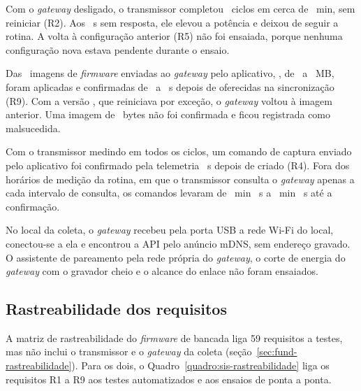 Com o \textit{gateway} desligado, o transmissor completou \sisSemGatewayCiclos\ ciclos em cerca de \sisSemGatewayMin~min, sem reiniciar (R2). Aos \sisSemGatewayFallbackS~s sem resposta, ele elevou a potência e deixou de seguir a rotina. A volta à configuração anterior (R5) não foi ensaiada, porque nenhuma configuração nova estava pendente durante o ensaio.

Das \sisOtaImagens\ imagens de \textit{firmware} enviadas ao \textit{gateway} pelo aplicativo, \sisOtaAplicadas, de \sisOtaTamanhoMin\ a \sisOtaTamanhoMax~MB, foram aplicadas e confirmadas de \sisOtaDuracaoMin\ a \sisOtaDuracaoMax~s depois de oferecidas na sincronização (R9). Com a versão \sisOtaRevertidaVersao, que reiniciava por exceção, o \textit{gateway} voltou à imagem anterior. Uma imagem de \sisOtaSemConfirmacaoBytes\ bytes não foi confirmada e ficou registrada como malsucedida.

Com o transmissor medindo em todos os ciclos, um comando de captura enviado pelo aplicativo foi confirmado pela telemetria \sisComandoCapturaS~s depois de criado (R4). Fora dos horários de medição da rotina, em que o transmissor consulta o \textit{gateway} apenas a cada intervalo de consulta, os comandos levaram de \sisComandoCapturaForaMin~min \sisComandoCapturaForaS~s a \sisComandoCapturaSemOndaMin~min \sisComandoCapturaSemOndaS~s até a confirmação.

No local da coleta, o \textit{gateway} recebeu pela porta USB a rede Wi-Fi do local, conectou-se a ela e encontrou a API pelo anúncio mDNS, sem endereço gravado. O assistente de pareamento pela rede própria do \textit{gateway}, o corte de energia do \textit{gateway} com o gravador cheio e o alcance do enlace não foram ensaiados.

\subsection{Rastreabilidade dos requisitos}\label{sec:sis-rastreabilidade}

A matriz de rastreabilidade do \textit{firmware} de bancada liga \num{59} requisitos a testes, mas não inclui o transmissor e o \textit{gateway} da coleta (seção~\ref{sec:fund-rastreabilidade}). Para os dois, o Quadro~\ref{quadro:sis-rastreabilidade} liga os requisitos R1 a R9 aos testes automatizados e aos ensaios de ponta a ponta.

